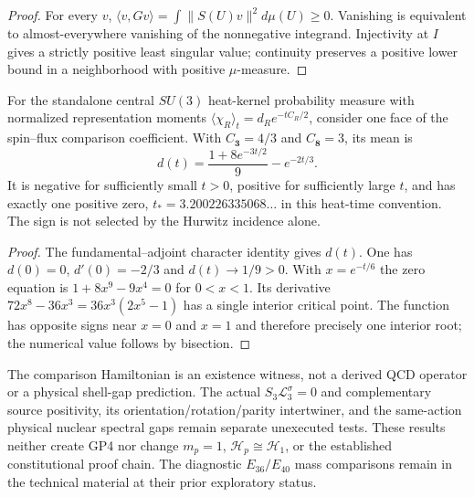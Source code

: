 \documentclass[12pt,a4paper]{article}
\begin{document}
\begin{proof}
For every $v$, $\langle v,Gv\rangle=
\int\lVert S(U)v\rVert^2d\mu(U)\ge0$. Vanishing is equivalent
to almost-everywhere vanishing of the nonnegative integrand.
Injectivity at $I$ gives a strictly positive least singular
value; continuity preserves a positive lower bound in a
neighborhood with positive $\mu$-measure.
\end{proof}
\begin{proposition}
\label{p12:prop:v357-heat-spinflux-sign}
For the standalone central $SU(3)$ heat-kernel probability
measure with normalized representation moments
$\langle\chi_R\rangle_t=d_Re^{-tC_R/2}$,
consider one face of the spin--flux comparison coefficient.
With $C_{\mathbf3}=4/3$ and $C_{\mathbf8}=3$, its mean is
\[
 d(t)=\frac{1+8e^{-3t/2}}9-e^{-2t/3}.
\]
It is negative for sufficiently small $t>0$, positive for
sufficiently large $t$, and has exactly one positive zero,
$t_*=3.200226335068\ldots$ in this heat-time convention.
The sign is not selected by the Hurwitz incidence alone.
\end{proposition}
\begin{proof}
The fundamental--adjoint character identity gives $d(t)$.
One has $d(0)=0$, $d'(0)=-2/3$ and $d(t)\to1/9>0$.
With $x=e^{-t/6}$ the zero equation is
$1+8x^9-9x^4=0$ for $0<x<1$.
Its derivative $72x^8-36x^3=36x^3(2x^5-1)$ has a
single interior critical point. The function has opposite
signs near $x=0$ and $x=1$ and therefore precisely one
interior root; the numerical value follows by bisection.
\end{proof}
\begin{remark}
\label{p12:rem:v357-hadronic-shell-frontier}
The comparison Hamiltonian is an existence witness, not a derived
QCD operator or a physical shell-gap prediction. The actual
$S_3\mathcal L_3^\sigma=0$ and complementary source positivity,
its orientation/rotation/parity intertwiner, and the same-action
physical nuclear spectral gaps remain separate unexecuted tests.
These results neither create GP4 nor change $m_p=1$,
$\mathcal H_p\cong\mathcal H_1$, or the established constitutional
proof chain. The diagnostic $E_{36}/E_{40}$ mass comparisons remain
in the technical material at their prior exploratory status.
\end{remark}


\end{document}

